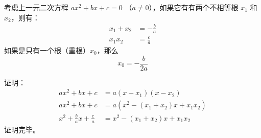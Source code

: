 
\begin{theorem}{}
考虑上一元二次方程 $a x^2 + b x + c = 0$ （$a \neq 0$），如果它有有两个不相等根 $x_1$ 和 $x_2$，则有：
$$\begin{aligned}
x_1 + x_2 &= -\frac{b}{a} \\
x_1 x_2 &= \frac{c}{a}
\end{aligned}$$
如果是只有一个根（重根）$x_0$，那么
$$
x_0 = - \frac{b}{2 a}
$$
\end{theorem}

证明：
$$\begin{aligned}
a x^2 + b x + c &= a (x - x_1) (x - x_2) \\
a x^2 + b x + c &= a (x^2 - (x_1 + x_2) x + x_1 x_2) \\
x^2 + \frac{b}{a} x + \frac{c}{a} &=  x^2 - (x_1 + x_2) x + x_1 x_2
\end{aligned}$$
证明完毕。
